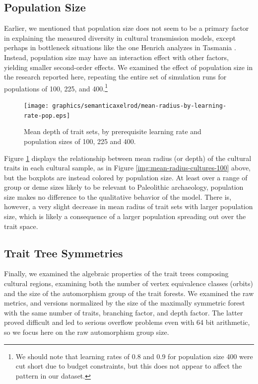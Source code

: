\subsection{Population Size}\label{population-size}

Earlier, we mentioned that population size does not seem to be a primary
factor in explaining the measured diversity in cultural transmission
models, except perhaps in bottleneck situations like the one Henrich
analyzes in Tasmania \citeyearpar{henrich2004}. Instead, population size
may have an interaction effect with other factors, yielding smaller
second-order effects. We examined the effect of population size in the
research reported here, repeating the entire set of simulation runs for
populations of 100, 225, and 400.\footnote{We should note that learning
  rates of 0.8 and 0.9 for population size 400 were cut short due to
  budget constraints, but this does not appear to affect the pattern in
  our dataset.}

\begin{figure}[htbp] 
\centering 
\texttt{[image: graphics/semanticaxelrod/mean-radius-by-learning-rate-pop.eps]} 
\caption{Mean depth of trait sets, by prerequisite learning rate and population sizes of 100, 225 and 400.} 
\label{img:mean-radius-cultures-pop} 
\end{figure}

Figure \ref{img:mean-radius-cultures-pop} displays the relationship
between mean radius (or depth) of the cultural traits in each cultural
sample, as in Figure \ref{img:mean-radius-cultures-100} above, but the
boxplots are instead colored by population size. At least over a range
of group or deme sizes likely to be relevant to Paleolithic archaeology,
population size makes no difference to the qualitative behavior of the
model. There is, however, a very slight decrease in mean radius of trait
sets with larger population size, which is likely a consequence of a
larger population spreading out over the trait space.

\subsection{Trait Tree Symmetries}\label{trait-tree-symmetries}

Finally, we examined the algebraic properties of the trait trees
composing cultural regions, examining both the number of vertex
equivalence classes (orbits) and the size of the automorphism group of
the trait forests. We examined the raw metrics, and versions normalized
by the size of the maximally symmetric forest with the same number of
traits, branching factor, and depth factor. The latter proved difficult
and led to serious overflow problems even with 64 bit arithmetic, so we
focus here on the raw automorphism group size.


